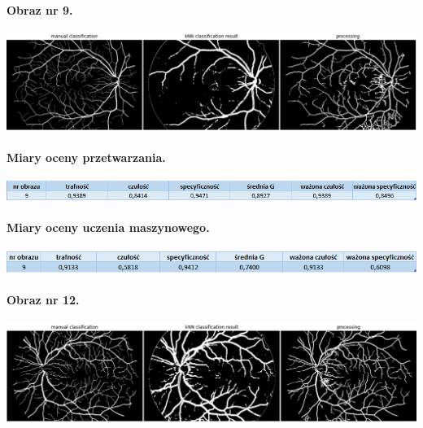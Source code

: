 \documentclass[a4paper, 11pt]{article}
\begin{document}
\paragraph{Obraz nr 9.}

\begin{center}
	
	\includegraphics[width=\textwidth]{./09_h.png}
	
\end{center}

\paragraph{Miary oceny przetwarzania.}
\begin{center}
	\includegraphics[width=\textwidth]{./processing/data9.png}
\end{center}

\paragraph{Miary oceny uczenia maszynowego.}
\begin{center}
	\includegraphics[width=\textwidth]{./ML/data9.png}
\end{center}

\newpage
\paragraph{Obraz nr 12.}

\begin{center}
	
	\includegraphics[width=\textwidth]{./12_h.png}
	
\end{center}
\end{document}
